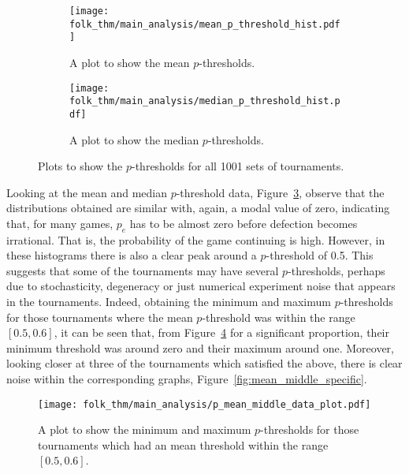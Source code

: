 \begin{figure}
    \begin{subfigure}{0.45\textwidth}
        \centering
        \texttt{[image: folk\_thm/main\_analysis/mean\_p\_threshold\_hist.pdf]}
        \caption{A plot to show the mean \(p\)-thresholds.}\label{subfig:mean_p_thresh}
    \end{subfigure}
    \hspace{3pt}
    \begin{subfigure}{0.45\textwidth}
        \centering
        \texttt{[image: folk\_thm/main\_analysis/median\_p\_threshold\_hist.pdf]}
        \caption{A plot to show the median \(p\)-thresholds.}\label{subfig:median_p_thresh}
    \end{subfigure}
    \caption{Plots to show the \(p\)-thresholds for all 1001 sets of tournaments.}\label{fig:mean_median_p_thresh}
\end{figure}


Looking at the mean and median \(p\)-threshold data, Figure~\ref{fig:mean_median_p_thresh}, observe that the distributions obtained
are similar with, again, a modal value of zero, indicating that, for many games,
\(p_{e}\) has to be almost zero before defection becomes irrational. That is,
the probability of the game continuing is high. However, in
these histograms there is also a clear peak around a \(p\)-threshold of 0.5. This
suggests that some of the tournaments may have several \(p\)-thresholds, perhaps due
to stochasticity, degeneracy or just numerical experiment noise that appears in the 
tournaments. Indeed, obtaining the minimum and maximum
\(p\)-thresholds for those tournaments where the mean \(p\)-threshold was within the range
\([0.5, 0.6]\), it can be seen that, from Figure~\ref{fig:p_mean_middle_plot}
for a significant proportion, their minimum
threshold was around zero and their maximum around one. Moreover, looking closer
at three of the tournaments which satisfied the above, there is clear noise
within the corresponding graphs, Figure~\ref{fig:mean_middle_specific}.


\begin{figure}
    \centering
    \texttt{[image: folk\_thm/main\_analysis/p\_mean\_middle\_data\_plot.pdf]}
    \caption{A plot to show the minimum and maximum \(p\)-thresholds for those tournaments which had an mean threshold within the range \([0.5, 0.6]\).}\label{fig:p_mean_middle_plot}
\end{figure}


